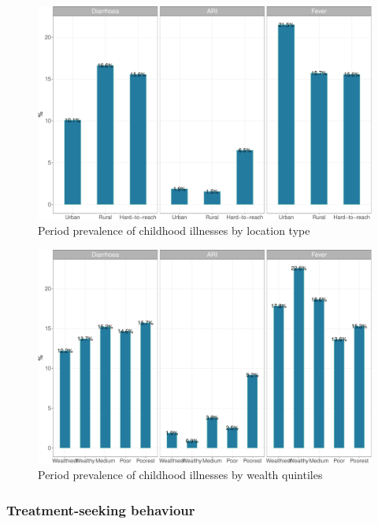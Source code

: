 \documentclass[12pt,a4paper]{article}
\begin{document}
\newpage

\begin{figure}[H]

{\centering \includegraphics{kayahReport_files/figure-latex/ill1plot-1} 

}

\caption{Period prevalence of childhood illnesses by location type}\label{fig:ill1plot}
\end{figure}

\begin{figure}[H]

{\centering \includegraphics{kayahReport_files/figure-latex/ill2plot-1} 

}

\caption{Period prevalence of childhood illnesses by wealth quintiles}\label{fig:ill2plot}
\end{figure}

\hypertarget{ctreatment}{%
\subsubsection{Treatment-seeking behaviour}\label{ctreatment}}
\end{document}

